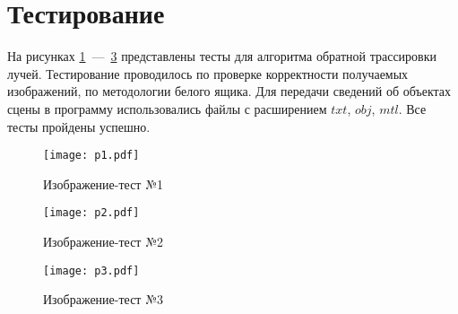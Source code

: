 \section{Тестирование}
На рисунках \ref{img:p1}~---~\ref{img:p3} представлены тесты для алгоритма обратной трассировки лучей. Тестирование проводилось по проверке корректности получаемых изображений, по методологии белого ящика. Для передачи сведений об объектах сцены в программу использовались файлы с расширением $txt$, $obj$, $mtl$. Все тесты пройдены успешно.

\begin{figure}[h!]
    \centering
    \texttt{[image: p1.pdf]}
    \caption{Изображение-тест №1}
    \label{img:p1}
\end{figure}

\newpage

\begin{figure}[h!]
    \centering
    \texttt{[image: p2.pdf]}
    \caption{Изображение-тест №2}
    \label{img:p2}
\end{figure}

\newpage

\begin{figure}[h!]
    \centering
    \texttt{[image: p3.pdf]}
    \caption{Изображение-тест №3}
    \label{img:p3}
\end{figure}

\newpage